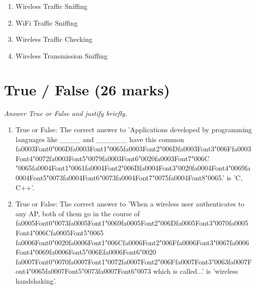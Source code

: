 \documentclass[12pt]{article}
\begin{document}
\begin{enumerate}[label=\arabic*.]
\begin{enumerate}[label=(\alph*)]
    \item Wireless Traffic Sniffing
    \item WiFi Traffic Sniffing
    \item Wireless Traffic Checking
    \item Wireless Transmission Sniffing
\end{enumerate}
\end{enumerate}

\section*{True / False (26 marks)}
\textit{Answer True or False and justify briefly.}
\begin{enumerate}[label=\arabic*.]
\item True or False: The correct answer to 'Applications developed by programming languages like \_\_\_\_ and \_\_\_\_\_\_ have this common {\csname fa0003Font0\endcsname\char"006D}{\csname fa0003Font1\endcsname\char"0065}{\csname fa0003Font2\endcsname\char"006D}{\csname fa0003Font3\endcsname\char"006F}{\csname fa0003Font4\endcsname\char"0072}{\csname fa0003Font5\endcsname\char"0079}{\csname fa0003Font6\endcsname\char"0020}{\csname fa0003Font7\endcsname\char"006C} {\char"0065}{\csname fa0004Font1\endcsname\char"0061}{\csname fa0004Font2\endcsname\char"006B}{\csname fa0004Font3\endcsname\char"0020}{\csname fa0004Font4\endcsname\char"0069}{\csname fa0004Font5\endcsname\char"0073}{\csname fa0004Font6\endcsname\char"0073}{\csname fa0004Font7\endcsname\char"0075}{\csname fa0004Font8\endcsname\char"0065}.' is 'C, C++'.
\item True or False: The correct answer to 'When a wireless user authenticates to any AP, both of them go in the course of {\csname fa0005Font0\endcsname\char"0073}{\csname fa0005Font1\endcsname\char"0069}{\csname fa0005Font2\endcsname\char"006D}{\csname fa0005Font3\endcsname\char"0070}{\csname fa0005Font4\endcsname\char"006C}{\csname fa0005Font5\endcsname\char"0065} {\csname fa0006Font0\endcsname\char"0020}{\csname fa0006Font1\endcsname\char"006C}{\csname fa0006Font2\endcsname\char"006F}{\csname fa0006Font3\endcsname\char"0067}{\csname fa0006Font4\endcsname\char"0069}{\csname fa0006Font5\endcsname\char"006E}{\csname fa0006Font6\endcsname\char"0020} {\csname fa0007Font0\endcsname\char"0070}{\csname fa0007Font1\endcsname\char"0072}{\csname fa0007Font2\endcsname\char"006F}{\csname fa0007Font3\endcsname\char"0063}{\csname fa0007Font4\endcsname\char"0065}{\csname fa0007Font5\endcsname\char"0073}{\csname fa0007Font6\endcsname\char"0073} which is called...' is 'wireless handshaking'.

\end{enumerate}
\end{document}
